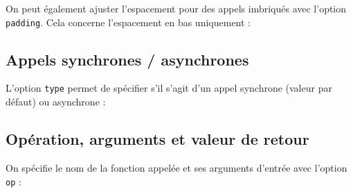 \documentclass[a4paper,11pt]{report}
\newcommand{\inputTikZ}[1]{%
  }%
\newcommand{\inputTikZ}[1]{%
    \texttt{[image: fig/\#1.pdf]}%
  }%
\begin{document}
\medskip

On peut également ajuster l'espacement pour des appels imbriqués avec l'option {\tt padding}. Cela concerne l'espacement en bas uniquement :

\medskip

\begin{minipage}{0.5\textwidth}

\end{minipage}
\begin{minipage}{0.5\textwidth}
\begin{center}
\inputTikZ{callpadding}
\end{center}
\end{minipage}

\subsection{Appels synchrones / asynchrones}\label{ss.callsync}

L'option {\tt type} permet de spécifier s'il s'agit d'un appel synchrone (valeur par défaut) ou asynchrone :

\medskip

\begin{minipage}{0.5\textwidth}

\end{minipage}
\begin{minipage}{0.5\textwidth}
\begin{center}
\inputTikZ{callsync}
\end{center}
\end{minipage}

\subsection{Opération, arguments et valeur de retour}\label{ss.callop}

On spécifie le nom de la fonction appelée et ses arguments d'entrée avec l'option {\tt op} :

\medskip

\begin{minipage}{0.5\textwidth}

\end{minipage}
\begin{minipage}{0.5\textwidth}
\begin{center}
\inputTikZ{callop}
\end{center}
\end{minipage}

\medskip
\end{document}
